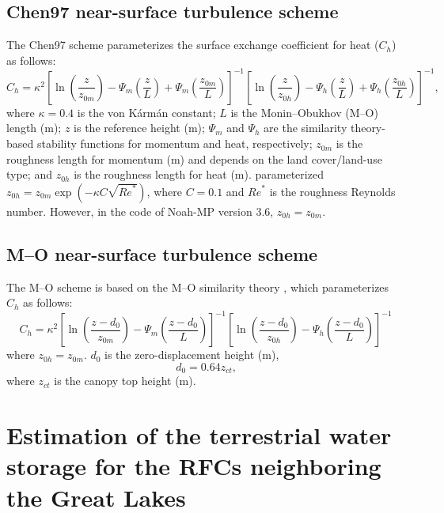 \documentclass[essd, manuscript]{copernicus}
\begin{document}
\subsection{Chen97 near-surface turbulence scheme}\label{sec:app:noahmp:chen97}

The Chen97 scheme \citep{chen1997BM} parameterizes the surface exchange coefficient for heat (\(C_{h}\)) as follows:
\begin{equation}
  C_{h} = \kappa^{2} \left[ \ln(\frac{z}{z_{0m}})
    - \Psi_{m}(\frac{z}{L})
    + \Psi_{m}(\frac{z_{0m}}{L})\right]^{-1}
  \left[\ln(\frac{z}{z_{0h}})
    - \Psi_{h}(\frac{z}{L})
    + \Psi_{h}(\frac{z_{0h}}{L})\right]^{-1}
  \text{,}
\end{equation}
where \(\kappa=0.4\) is the von Kármán constant; \(L\) is the Monin--Obukhov (M--O) length (m); \(z\) is the reference height (m); \(\Psi_{m}\) and \(\Psi_{h}\) are the similarity theory-based stability functions for momentum and heat, respectively; \(z_{0m}\) is the roughness length for momentum (m) and depends on the land cover/land-use type; and \(z_{0h}\) is the roughness length for heat (m). \citet{niu2011JGRA} parameterized \(z_{0h} = z_{0m} \exp(-\kappa C \sqrt{{Re}^*})\), where \(C=0.1\) and \({Re}^*\) is the roughness Reynolds number. However, in the code of Noah-MP version 3.6, \(z_{0h} = z_{0m}\).

\subsection{M--O near-surface turbulence scheme}\label{sec:app:noahmp:mo}

The M--O scheme is based on the M--O similarity theory \citep{brutsaert1982}, which parameterizes \(C_h\) as follows:
\begin{equation}
  C_h = \kappa^2 \left[ \ln(\frac{z - d_{0}}{z_{0m}})
    - \Psi_{m}(\frac{z - d_0}{L})\right]^{-1}
  \left[\ln(\frac{z - d_0}{z_{0h}})
    -\Psi_{h}(\frac{z - d_0}{L})\right]^{-1}
\end{equation}
where \(z_{0h} = z_{0m}\). \(d_0\) is the zero-displacement height (m),
\begin{equation}
  d_0 = 0.64 z_{ct}
  \text{,}
\end{equation}
where \(z_{ct}\) is the canopy top height (m).

\section{Estimation of the terrestrial water storage for the RFCs neighboring the Great Lakes} \label{app:tws}
\end{document}
